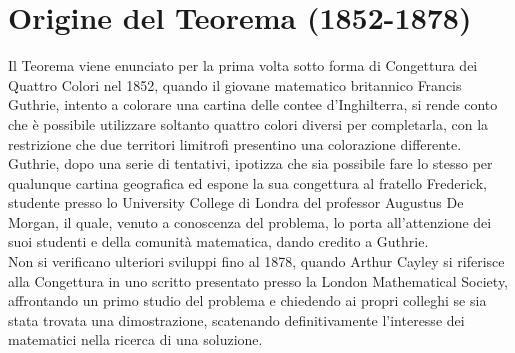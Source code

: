 \documentclass[a4paper,12pt,titlepage]{report}
\begin{document}
	\section[Origine del Teorema]{Origine del Teorema (1852-1878)}
	Il Teorema viene enunciato per la prima volta sotto forma di Congettura dei Quattro Colori nel 1852, quando il giovane matematico britannico Francis Guthrie, intento a colorare una cartina delle contee d’Inghilterra, si rende conto che è possibile utilizzare soltanto quattro colori diversi per completarla, con la restrizione che due territori limitrofi presentino una colorazione differente.
	\\Guthrie, dopo una serie di tentativi, ipotizza che sia possibile fare lo stesso per qualunque cartina geografica ed espone la sua congettura al fratello Frederick, studente presso lo University College di Londra del professor Augustus De Morgan, il quale, venuto a conoscenza del problema, lo porta all’attenzione dei suoi studenti e della comunità matematica, dando credito a Guthrie.
	\\Non si verificano ulteriori sviluppi fino al 1878, quando Arthur Cayley si riferisce alla Congettura in uno scritto presentato presso la London Mathematical Society, affrontando un primo studio del problema e chiedendo ai propri colleghi se sia stata trovata una dimostrazione, scatenando definitivamente l’interesse dei matematici nella ricerca di una soluzione.
	\vspace{0.5cm}
	
\end{document}
